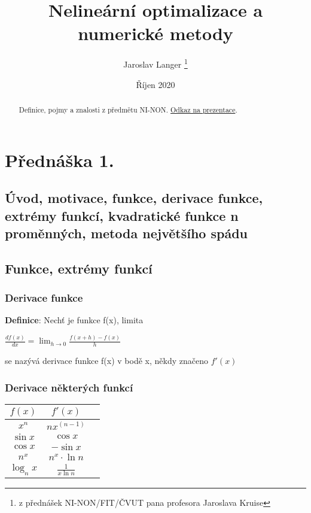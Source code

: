 \documentclass[12pt, letterpaper, twoside]{article}
\title{Nelineární optimalizace a numerické metody}
\author{Jaroslav Langer \thanks{z přednášek NI-NON/FIT/ČVUT pana profesora Jaroslava Kruise}}
\date{Říjen 2020}
\begin{document}
\maketitle

\tableofcontents

\begin{abstract}
Definice, pojmy a znalosti z předmětu NI-NON. \href{http://mech.fsv.cvut.cz/~jk/minon2021.html}{Odkaz na prezentace}.
\end{abstract}

\section{Přednáška 1.}

\subsection*{Úvod, motivace, funkce, derivace funkce, extrémy funkcí, kvadratické funkce n proměnných, metoda největšího spádu}

\subsection{Funkce, extrémy funkcí}

\subsubsection{Derivace funkce}

\textbf{Definice}: Nechť je funkce f(x), limita

\begin{math}
    \frac{d f(x)}{d x} = \lim_{h \to 0} \frac{f(x+h)-f(x)}{h}
\end{math}

se nazývá derivace funkce f(x) v bodě x, někdy značeno $f'(x)$

\subsubsection{Derivace některých funkcí}

\begin{center}
\begin{tabular}{ |c|c|c| }
    \hline
    $f(x)$ & $f'(x)$ \\
    \hline
    $x^n$ & $nx^{(n-1)}$ \\
    $\sin x$ & $\cos x$ \\
    $\cos x$ & $- \sin x$ \\
    $n^x$ & $n^x \cdot \ln n$ \\
    $\log_{n} x$ & $ \frac{1}{x \ln n}$ \\
    \hline
\end{tabular}
\end{center}
\end{document}

